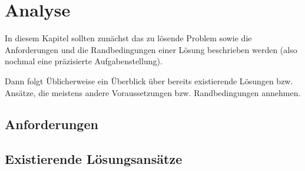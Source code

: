 
\chapter{Analyse}
\label{ch:Analyse}
In diesem Kapitel sollten zun{\"a}chst das zu l{\"o}sende Problem
sowie die Anforderungen und die Randbedingungen 
einer L{\"o}sung beschrieben werden (also nochmal
eine pr{\"a}zisierte Aufgabenstellung).

Dann folgt {\"U}blicherweise ein {\"U}berblick {\"u}ber bereits existierende
L{\"o}sungen bzw. Ans{\"a}tze, die meistens andere Voraussetzungen bzw.
Randbedingungen annehmen.


\section{Anforderungen}
\label{ch:Analyse:sec:Anforderungen}




\section{Existierende L{\"o}sungsans{\"a}tze}
\label{ch:Analyse:sec:RelatedWork}



%






